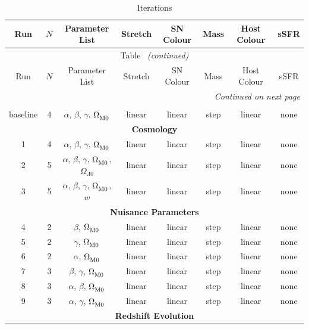 \clearpage
\onecolumngrid
\begin{longtable}{c c c c c c c c}
    \caption{Iterations} \label{tab:iterations} \\
    \hline
    \hline
    Run & $N$ & Parameter List & Stretch & SN Colour & Mass & Host Colour & sSFR \\
    \hline
    \hline
    \endfirsthead
    \multicolumn{8}{c}{Table~\thetable{} \emph{(continued)}} \\
    \hline
    \hline
    Run & $N$ & Parameter List & Stretch & SN Colour & Mass & Host Colour & sSFR \\
    \hline
    \hline
    \endhead
    \hline
    \multicolumn{8}{r}{\emph{Continued on next page}} \\
    \endfoot
    \hline
    \endlastfoot
    \multicolumn{8}{c}{\textbf{Baseline}} \\
    \hline
    baseline & 4 & $\alpha$, $\beta$, $\gamma$, $\Omega_{\rm M0}^{}$ & linear & linear & step & linear & none \\
    \hline
    \multicolumn{8}{c}{\textbf{Cosmology}} \\
    \hline
    1 & 4 & $\alpha$, $\beta$, $\gamma$, $\Omega_{\rm M0}^{}$ & linear & linear & step & linear & none \\
    2 & 5 & $\alpha$, $\beta$, $\gamma$, $\Omega_{\rm M0}^{}$, $\Omega_{\Lambda 0}^{}$ & linear & linear & step & linear & none \\
    3 & 5 & $\alpha$, $\beta$, $\gamma$, $\Omega_{\rm M0}^{}$, $w$ & linear & linear & step & linear & none \\
    \hline
    \multicolumn{8}{c}{\textbf{Nuisance Parameters}} \\
    \hline
    4 & 2 & $\beta$, $\Omega_{\rm M0}^{}$ & linear & linear & step & linear & none \\
    5 & 2 & $\gamma$, $\Omega_{\rm M0}^{}$ & linear & linear & step & linear & none \\
    6 & 2 & $\alpha$, $\Omega_{\rm M0}^{}$ & linear & linear & step & linear & none \\
    7 & 3 & $\beta$, $\gamma$, $\Omega_{\rm M0}^{}$ & linear & linear & step & linear & none \\
    8 & 3 & $\alpha$, $\beta$, $\Omega_{\rm M0}^{}$ & linear & linear & step & linear & none \\
    9 & 3 & $\alpha$, $\gamma$, $\Omega_{\rm M0}^{}$ & linear & linear & step & linear & none \\
    \hline
    \multicolumn{8}{c}{\textbf{Redshift Evolution}} \\

\end{longtable}
